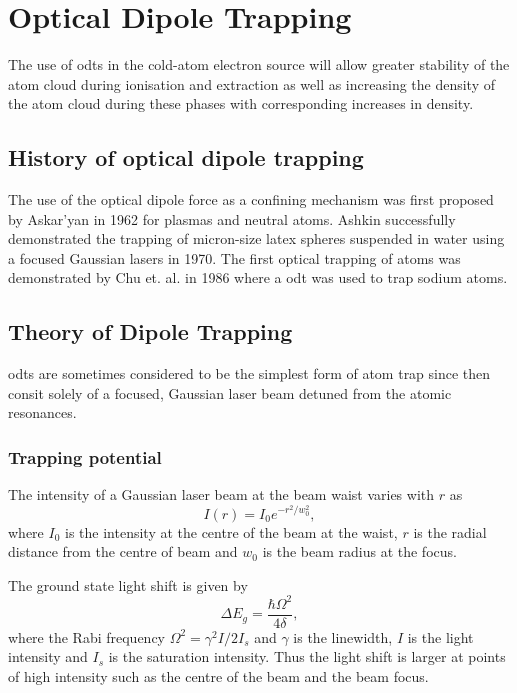 \section{Optical Dipole Trapping}

The use of \glspl{odt} in the cold-atom electron source will allow greater stability of the atom cloud during ionisation and extraction as well as increasing the density of the atom cloud during these phases with corresponding increases in density.

\subsection{History of optical dipole trapping}
The use of the optical dipole force as a confining mechanism was first proposed by Askar'yan in 1962\cite{askaryan_effects_1962} for plasmas and neutral atoms. Ashkin successfully demonstrated the trapping of micron-size latex spheres suspended in water using a focused Gaussian lasers in 1970\cite{ashkin_acceleration_1970}. The first optical trapping of atoms was demonstrated by Chu et. al. in 1986\cite{chu_experimental_1986} where a \gls{odt} was used to trap sodium atoms.

\subsection{Theory of Dipole Trapping}
\Glspl{odt} are sometimes considered to be the simplest form of atom trap since then consit solely of a focused, Gaussian laser beam detuned from the atomic resonances.

\subsubsection{Trapping potential}
The intensity of a Gaussian laser beam at the beam waist varies with $r$ as
\begin{equation}
I(r) = I_0e^{-r^2 / w_0^2},
\end{equation}
where $I_0$ is the intensity at the centre of the beam at the waist, $r$ is the radial distance from the centre of beam and $w_0$ is the beam radius at the focus.

The ground state light shift is given by\cite{metcalf_laser_1999}
\begin{equation}
\Delta E_g = \frac{\hbar \Omega^2}{4\delta},
\end{equation}
where the Rabi frequency $\Omega^2= \gamma^2 I / 2 I_s$ and $\gamma$ is the linewidth, $I$ is the light intensity and $I_s$ is the saturation intensity. Thus the light shift is larger at points of high intensity such as the centre of the beam and the beam focus.

